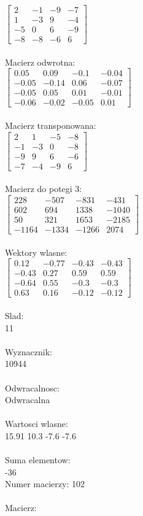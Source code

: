 \documentclass[a4paper,12pt]{article}
\begin{document}
$\begin{bmatrix} 2&-1&-9&-7\\1&-3&9&-4\\-5&0&6&-9\\-8&-8&-6&6 \end{bmatrix}$
\\
\\
Macierz odwrotna:\\

$\begin{bmatrix} 0.05&0.09&-0.1&-0.04\\-0.05&-0.14&0.06&-0.07\\-0.05&0.05&0.01&-0.01\\-0.06&-0.02&-0.05&0.01 \end{bmatrix}$
\\
\\
Macierz transponowana:\\

$\begin{bmatrix} 2&1&-5&-8\\-1&-3&0&-8\\-9&9&6&-6\\-7&-4&-9&6 \end{bmatrix}$
\\
\\
Macierz do potegi 3:\\

$\begin{bmatrix} 228&-507&-831&-431\\602&694&1338&-1040\\50&321&1653&-2185\\-1164&-1334&-1266&2074 \end{bmatrix}$
\\
\\
Wektory wlasne:\\

$\begin{bmatrix} 0.12&-0.77&-0.43&-0.43\\-0.43&0.27&0.59&0.59\\-0.64&0.55&-0.3&-0.3\\0.63&0.16&-0.12&-0.12 \end{bmatrix}$
\\
\\
Slad:\\
11
\\
\\
Wyznacznik:\\
10944
\\
\\
Odwracalnosc:\\
Odwracalna
\\
\\
Wartosci wlasne:\\
15.91 10.3 -7.6 -7.6
\\
\\
Suma elementow:\\
-36
\\
\newpage
Numer macierzy:
102
\\
\\
Macierz:\\
\end{document}
